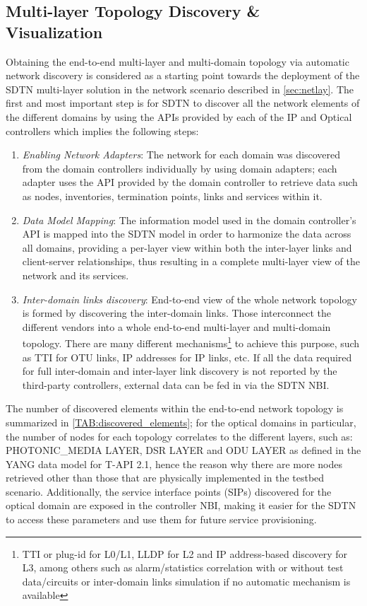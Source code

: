 \documentclass[a4paper,fleqn]{cas-dc}
\begin{document}
\subsection{Multi-layer Topology Discovery \& Visualization}
Obtaining the end-to-end multi-layer and multi-domain topology via automatic network discovery is considered as a starting point towards the deployment of the SDTN multi-layer solution in the network scenario described in \ref{sec:netlay}. The first and most important step is for SDTN to discover all the network elements of the different domains by using the APIs provided by each of the IP and Optical controllers which implies the following steps:
\begin{enumerate}
    \item \textit{Enabling Network Adapters}: The network for each domain was discovered from the domain controllers individually by using domain adapters; each adapter uses the API provided by the domain controller to retrieve data such as nodes, inventories, termination points, links and services within it.
    \item \textit{Data Model Mapping}: The information model used in the domain controller's API is mapped into the SDTN model in order to harmonize the data across all domains, providing a per-layer view within both the inter-layer links and client-server relationships, thus resulting in a complete multi-layer view of the network and its services.
    \item \textit{Inter-domain links discovery}: End-to-end view of the whole network topology is formed by discovering the inter-domain links. Those interconnect the different vendors into a whole end-to-end multi-layer and multi-domain topology. There are many different mechanisms\footnote{TTI or plug-id for L0/L1, LLDP for L2 and IP address-based discovery for L3, among others such as alarm/statistics correlation with or without test data/circuits or inter-domain links simulation if no automatic mechanism is available} to achieve this purpose, such as TTI for OTU links, IP addresses for IP links, etc. If all the data required for full inter-domain and inter-layer link discovery is not reported by the third-party controllers, external data can be fed in via the SDTN NBI. 
\end{enumerate}

The number of discovered elements within the end-to-end network topology is summarized in \cref{TAB:discovered_elements}; for the optical domains in particular, the number of nodes for each topology correlates to the different layers, such as:
PHOTONIC\_MEDIA LAYER, DSR LAYER and ODU LAYER as defined in the YANG data model for T-API 2.1, hence the reason why there are more nodes retrieved other than those that are physically implemented in the testbed scenario. Additionally, the service interface points (SIPs) discovered for the optical domain are exposed in the controller NBI, making it easier for the SDTN to access these parameters and use them for future service provisioning. 
\end{document}
